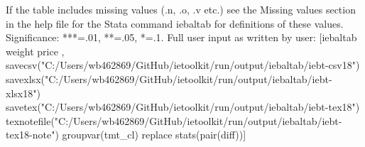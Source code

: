 If the table includes missing values (.n, .o, .v etc.) see the Missing values section in the help file for the Stata command iebaltab for definitions of these values. Significance: ***=.01, **=.05, *=.1. Full user input as written by user: [iebaltab weight price , savecsv("C:/Users/wb462869/GitHub/ietoolkit/run/output/iebaltab/iebt-csv18") savexlsx("C:/Users/wb462869/GitHub/ietoolkit/run/output/iebaltab/iebt-xlsx18") savetex("C:/Users/wb462869/GitHub/ietoolkit/run/output/iebaltab/iebt-tex18") texnotefile("C:/Users/wb462869/GitHub/ietoolkit/run/output/iebaltab/iebt-tex18-note") groupvar(tmt\_cl) replace stats(pair(diff))] 

